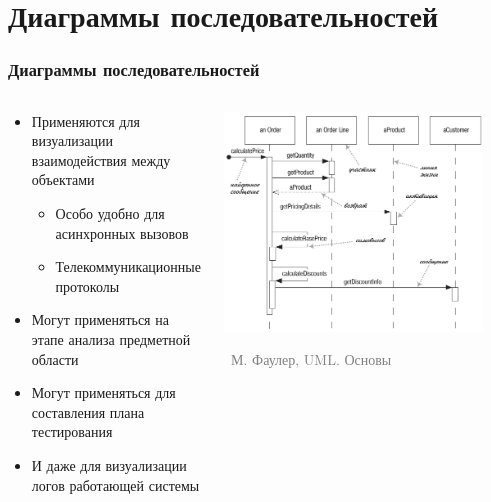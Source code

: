 \documentclass[xetex,mathserif,serif]{beamer}
\newcommand{\attribution}[1] {
    \vspace{-5mm}\begin{flushright}\begin{scriptsize}\textcolor{gray}{\textcopyright\, #1}\end{scriptsize}\end{flushright}
}
\begin{document}
    \section{Диаграммы последовательностей}

    \begin{frame}
        \frametitle{Диаграммы последовательностей}
        \begin{columns}
            \begin{column}{0.5\textwidth}
                \begin{itemize}
                    \item Применяются для визуализации взаимодействия между объектами
                    \begin{itemize}
                        \item Особо удобно для асинхронных вызовов
                        \item Телекоммуникационные протоколы
                    \end{itemize}
                    \item Могут применяться на этапе анализа предметной области
                    \item Могут применяться для составления плана тестирования
                    \item И даже для визуализации логов работающей системы
                \end{itemize}
            \end{column}
            \begin{column}{0.5\textwidth}
                \begin{center}
                    \includegraphics[width=0.9\textwidth]{sequenceDiagramSyntax.png}
                    \attribution{М. Фаулер, UML. Основы}
                \end{center}
            \end{column}
        \end{columns}
    \end{frame}
\end{document}
